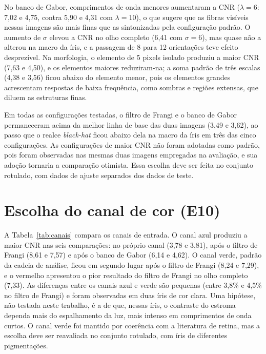\documentclass[12pt, oneside, a4paper, chapter=TITLE, section=TITLE,
               english, brazil]{abntex2}
\newcommand{\secao}[1]{\section[\texorpdfstring{\protect\MakeTextUppercase{#1}}{#1}]{#1}}
\newcommand{\bh}{\emph{black-hat}}
\begin{document}
No banco de Gabor, comprimentos de onda menores aumentaram a CNR
($\lambda = 6$: 7,02 e 4,75, contra 5,90 e 4,31 com $\lambda = 10$), o que
sugere que as fibras visíveis nessas imagens são mais finas que as
sintonizadas pela configuração padrão. O aumento de $\sigma$ elevou a CNR no
olho completo (6,41 com $\sigma = 6$), mas quase não a alterou na macro da
íris,
e a passagem de 8 para 12 orientações teve efeito desprezível. Na morfologia,
o elemento de 5 pixels isolado produziu a maior CNR (7,63 e 4,50), e os
elementos maiores reduziram-na; a soma padrão de três escalas (4,38 e 3,56)
ficou abaixo do elemento menor, pois os elementos grandes acrescentam
respostas de baixa frequência, como sombras e regiões extensas, que diluem as
estruturas finas.

Em todas as configurações testadas, o filtro de Frangi e o banco de Gabor
permaneceram acima da melhor linha de base das duas imagens (3,49 e 3,62), ao
passo que o realce \bh{} ficou abaixo dela na macro da íris em três das cinco
configurações. As configurações de maior CNR não foram adotadas como padrão,
pois foram observadas nas mesmas duas imagens empregadas na avaliação, e sua
adoção tornaria a comparação otimista. Essa escolha deve ser feita no
conjunto rotulado, com dados de ajuste separados dos dados de teste.

\secao{Escolha do canal de cor (E10)}
\label{sec:res-canal}

A Tabela~\ref{tab:canais} compara os canais de entrada. O canal azul produziu
a maior CNR nas seis comparações: no próprio canal (3,78 e 3,81), após o
filtro de Frangi (8,61 e 7,57) e após o banco de Gabor (6,14 e 4,62). O canal
verde, padrão da cadeia de análise, ficou em segundo lugar após o filtro de
Frangi (8,24 e 7,29), e o vermelho apresentou o pior resultado do filtro de
Frangi no olho completo (7,33). As diferenças entre os canais azul e verde são
pequenas (entre 3,8\% e 4,5\% no filtro de Frangi) e foram observadas em duas
íris de cor clara. Uma hipótese, não testada neste trabalho, é a de que,
nessas íris, o contraste do estroma dependa mais do espalhamento da luz, mais
intenso em comprimentos de onda curtos. O canal verde foi mantido por
coerência com a literatura de retina, mas a escolha deve ser reavaliada no
conjunto rotulado, com íris de diferentes pigmentações.

\begin{table}[htbp]
  \caption{CNR no anel por canal de entrada (E10)}
  \label{tab:canais}
  \centering\footnotesize
  
\end{table}
\end{document}
